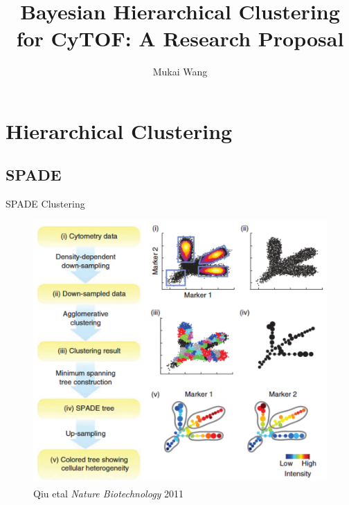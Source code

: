 \documentclass{beamer}
\begin{document}
	\title[Bayesian Hierarchical Clustering]{Bayesian Hierarchical Clustering for CyTOF: A Research Proposal}
	\author{Mukai Wang}
	
	\begin{frame}
		\titlepage
	\end{frame}
	
	\begin{frame}
		\tableofcontents[hideallsubsections]
	\end{frame}

	\section{Hierarchical Clustering}
	\subsection{SPADE}
	
	\begin{frame}
		\tableofcontents
		[
		currentsection,
		currentsubsection,
		subsectionstyle=show/shaded/hide
		]
	\end{frame}
	
	\begin{frame}{SPADE Clustering}
		\begin{figure}[htbp]
			\centering
			\includegraphics[scale=0.5]{SPADE.png}
			\caption*{Qiu etal \emph{Nature Biotechnology} 2011}
		\end{figure}
	\end{frame}
	
\end{document}

